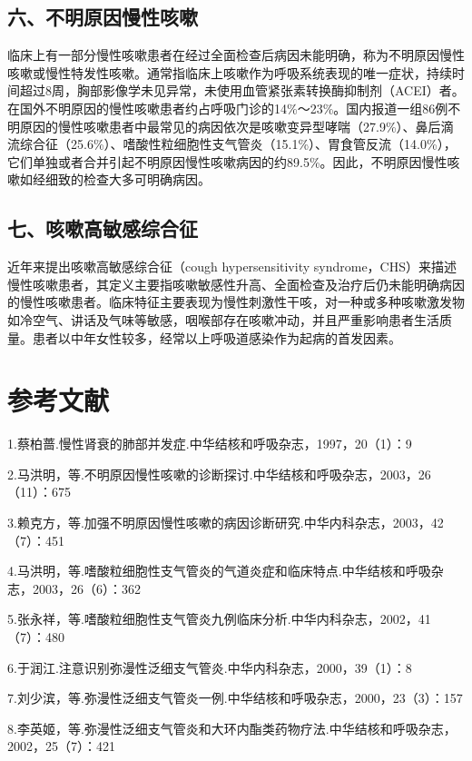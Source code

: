 \subsection{六、不明原因慢性咳嗽}

临床上有一部分慢性咳嗽患者在经过全面检查后病因未能明确，称为不明原因慢性咳嗽或慢性特发性咳嗽。通常指临床上咳嗽作为呼吸系统表现的唯一症状，持续时间超过8周，胸部影像学未见异常，未使用血管紧张素转换酶抑制剂（ACEI）者。在国外不明原因的慢性咳嗽患者约占呼吸门诊的14\%～23\%。国内报道一组86例不明原因的慢性咳嗽患者中最常见的病因依次是咳嗽变异型哮喘（27.9\%）、鼻后滴流综合征（25.6\%）、嗜酸性粒细胞性支气管炎（15.1\%）、胃食管反流（14.0\%），它们单独或者合并引起不明原因慢性咳嗽病因的约89.5\%。因此，不明原因慢性咳嗽如经细致的检查大多可明确病因。

\subsection{七、咳嗽高敏感综合征}

近年来提出咳嗽高敏感综合征（cough hypersensitivity
syndrome，CHS）来描述慢性咳嗽患者，其定义主要指咳嗽敏感性升高、全面检查及治疗后仍未能明确病因的慢性咳嗽患者。临床特征主要表现为慢性刺激性干咳，对一种或多种咳嗽激发物如冷空气、讲话及气味等敏感，咽喉部存在咳嗽冲动，并且严重影响患者生活质量。患者以中年女性较多，经常以上呼吸道感染作为起病的首发因素。

\protect\hypertarget{text00068.html}{}{}

\section{参考文献}

1.蔡柏蔷.慢性肾衰的肺部并发症.中华结核和呼吸杂志，1997，20（1）：9

2.马洪明，等.不明原因慢性咳嗽的诊断探讨.中华结核和呼吸杂志，2003，26（11）：675

3.赖克方，等.加强不明原因慢性咳嗽的病因诊断研究.中华内科杂志，2003，42（7）：451

4.马洪明，等.嗜酸粒细胞性支气管炎的气道炎症和临床特点.中华结核和呼吸杂志，2003，26（6）：362

5.张永祥，等.嗜酸粒细胞性支气管炎九例临床分析.中华内科杂志，2002，41（7）：480

6.于润江.注意识别弥漫性泛细支气管炎.中华内科杂志，2000，39（1）：8

7.刘少滨，等.弥漫性泛细支气管炎一例.中华结核和呼吸杂志，2000，23（3）：157

8.李英姬，等.弥漫性泛细支气管炎和大环内酯类药物疗法.中华结核和呼吸杂志，2002，25（7）：421

